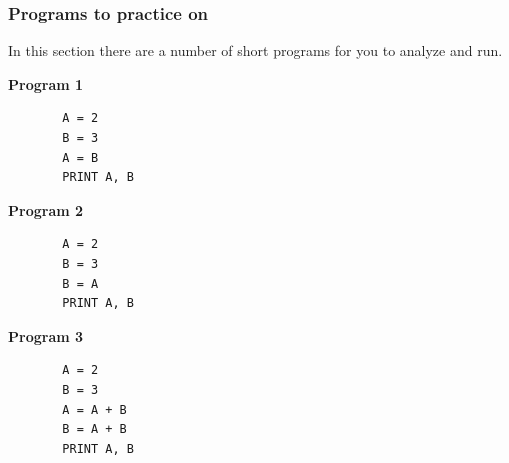 \subsubsection{Programs to practice on}
\label{subsubsec:programs-to-practice-on}

In this section there are a number of short programs for you to analyze and run.
\begin{center}
\begin{description}
\item[\textbf{Program 1}]

\begin{verbatim}
  A = 2
  B = 3
  A = B
  PRINT A, B
\end{verbatim}

\item[\textbf{Program 2}]

\begin{verbatim}
  A = 2
  B = 3
  B = A
  PRINT A, B
\end{verbatim}

\item[\textbf{Program 3}]

\begin{verbatim}
  A = 2
  B = 3
  A = A + B
  B = A + B
  PRINT A, B
\end{verbatim}

\end{description}
\end{center}


